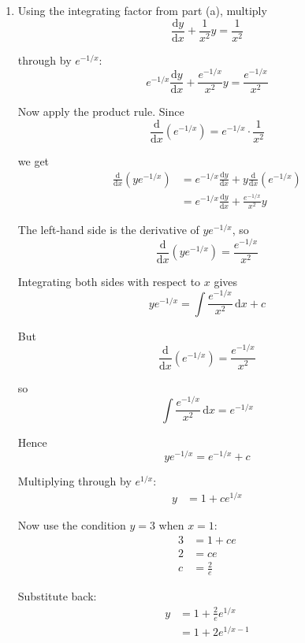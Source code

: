 \documentclass[leqno]{article}
\begin{document}
\begin{enumerate}[
  label=\textbf{\arabic*.},
  leftmargin=*,
  topsep=0pt,
  partopsep=0pt,
  parsep=0pt
]
\begin{djsSolution}
\begin{enumerate}[label=\textbf{(\alph*)}]
Hence an appropriate integrating factor is $e^{-1/x}$.

  \item Using the integrating factor from part (a), multiply
\[
\frac{\mathrm{d}y}{\mathrm{d}x}+\frac{1}{x^2}y=\frac{1}{x^2}
\]

through by $e^{-1/x}$:
\[
e^{-1/x}\frac{\mathrm{d}y}{\mathrm{d}x}+\frac{e^{-1/x}}{x^2}y=\frac{e^{-1/x}}{x^2}
\]

Now apply the product rule. Since
\[
\frac{\mathrm{d}}{\mathrm{d}x}\left(e^{-1/x}\right)=e^{-1/x}\cdot \frac{1}{x^2}
\]

we get
\begin{align*}
\frac{\mathrm{d}}{\mathrm{d}x}\left(ye^{-1/x}\right)
&=e^{-1/x}\frac{\mathrm{d}y}{\mathrm{d}x}+y\frac{\mathrm{d}}{\mathrm{d}x}\left(e^{-1/x}\right) \\
&=e^{-1/x}\frac{\mathrm{d}y}{\mathrm{d}x}+\frac{e^{-1/x}}{x^2}y
\end{align*}

The left-hand side is the derivative of $ye^{-1/x}$, so
\[
\frac{\mathrm{d}}{\mathrm{d}x}\left(ye^{-1/x}\right)=\frac{e^{-1/x}}{x^2}
\]

Integrating both sides with respect to $x$ gives
\[
ye^{-1/x}=\int \frac{e^{-1/x}}{x^2}\,\mathrm{d}x+c
\]

But
\[
\frac{\mathrm{d}}{\mathrm{d}x}\left(e^{-1/x}\right)=\frac{e^{-1/x}}{x^2}
\]

so
\[
\int \frac{e^{-1/x}}{x^2}\,\mathrm{d}x=e^{-1/x}
\]

Hence
\[
ye^{-1/x}=e^{-1/x}+c
\]

Multiplying through by $e^{1/x}$:
\begin{align*}
y&=1+ce^{1/x}
\end{align*}

Now use the condition $y=3$ when $x=1$:
\begin{align*}
3&=1+ce \\
2&=ce \\
c&=\frac{2}{e}
\end{align*}

Substitute back:
\begin{align*}
y&=1+\frac{2}{e}e^{1/x} \\
&=1+2e^{1/x-1}
\end{align*}
\end{enumerate}
\end{djsSolution}


\newpage

\questionitem


\end{enumerate}
\end{document}
